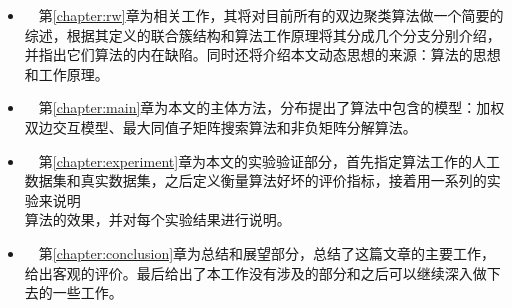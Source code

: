 \vspace{2mm}
\begin{itemize}
  \item ~~第\ref{chapter:rw}章为相关工作，其将对目前所有的双边聚类算法做一个简要的综述，根据其定义的联合簇结构和算法工作原理将其分成几个分支分别介绍，并指出它们算法的内在缺陷。同时还将介绍本文动态思想的来源：\Sync{}算法的思想和工作原理。
  \vspace{1mm}
  \item ~~第\ref{chapter:main}章为本文的主体方法，分布提出了\CoSync{}算法中包含的模型：加权双边交互模型、最大同值子矩阵搜索算法和非负矩阵分解算法。
  \vspace{1mm}
  \item ~~第\ref{chapter:experiment}章为本文的实验验证部分，首先指定算法工作的人工数据集和真实数据集，之后定义衡量算法好坏的评价指标，接着用一系列的实验来说明\CoSync{}\\算法的效果，并对每个实验结果进行说明。
  \vspace{1mm}
  \item ~~第\ref{chapter:conclusion}章为总结和展望部分，总结了这篇文章的主要工作，给出客观的评价。最后给出了本工作没有涉及的部分和之后可以继续深入做下去的一些工作。
\end{itemize}

\newpage\mbox{}\thispagestyle{empty}\newpage
